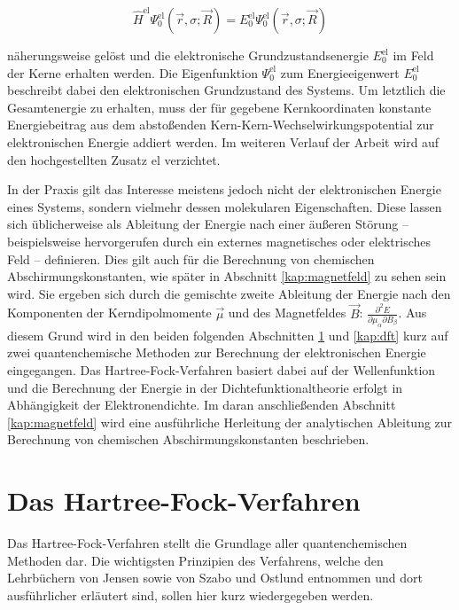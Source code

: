 \begin{equation}
  \hat{H}^{\text{el}}\Psi^{\text{el}}_0(\vec{r},\sigma;\vec{R})=E^{\text{el}}_0\Psi^{\text{el}}_0(\vec{r},\sigma;\vec{R})
\end{equation}

näherungsweise gelöst und die elektronische Grundzustandsenergie $E^{\text{el}}_0$ im Feld der Kerne erhalten werden. Die Eigenfunktion $\Psi^{\text{el}}_0$ zum Energieeigenwert $E^{\text{el}}_0$ beschreibt dabei den elektronischen Grundzustand des Systems. Um letztlich die Gesamtenergie zu erhalten, muss der für gegebene Kernkoordinaten konstante Energiebeitrag aus dem abstoßenden Kern-Kern-Wechselwirkungspotential zur elektronischen Energie addiert werden. Im weiteren Verlauf der Arbeit wird auf den hochgestellten Zusatz \glqq el\grqq{} verzichtet. 

In der Praxis gilt das Interesse meistens jedoch nicht der elektronischen Energie eines Systems, sondern vielmehr dessen molekularen Eigenschaften. Diese lassen sich üblicherweise als Ableitung der Energie nach einer äußeren Störung -- beispielsweise hervorgerufen durch ein externes magnetisches oder elektrisches Feld -- definieren. Dies gilt auch für die Berechnung von chemischen Abschirmungskonstanten, wie später in Abschnitt \ref{kap:magnetfeld} zu sehen sein wird. Sie ergeben sich durch die gemischte zweite Ableitung der Energie nach den Komponenten der Kerndipolmomente $\vec{\mu}$ und des Magnetfeldes $\vec{B}$: $\frac{\partial^2 E}{\partial\mu_\alpha\partial B_\beta}$. Aus diesem Grund wird in den beiden folgenden Abschnitten \ref{kap:hartreefock} und \ref{kap:dft} kurz auf zwei quantenchemische Methoden zur Berechnung der elektronischen Energie eingegangen. Das Hartree-Fock-Verfahren basiert dabei auf der Wellenfunktion und die Berechnung der Energie in der Dichtefunktionaltheorie erfolgt in Abhängigkeit der Elektronendichte. Im daran anschließenden Abschnitt \ref{kap:magnetfeld} wird eine ausführliche Herleitung der analytischen Ableitung zur Berechnung von chemischen Abschirmungskonstanten beschrieben. 


\section{Das Hartree-Fock-Verfahren}\label{kap:hartreefock}

Das Hartree-Fock-Verfahren stellt die Grundlage aller quantenchemischen Methoden dar. Die wichtigsten Prinzipien des Verfahrens, welche den Lehrbüchern von Jensen\supercite{jensen2009introduction} sowie von Szabo und Ostlund\supercite{szabo1982modern} entnommen und dort ausführlicher erläutert sind, sollen hier kurz wiedergegeben werden. 

